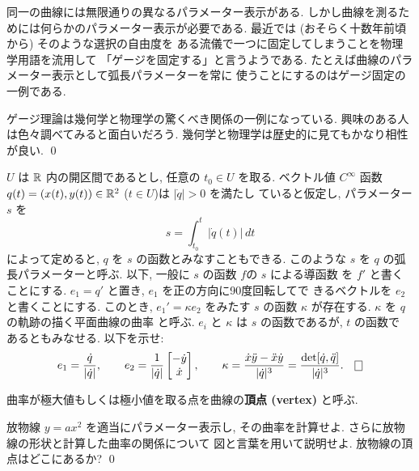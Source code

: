 \documentclass[12pt,twoside]{jarticle}
\newcommand\qstar[1]{}
\begin{document}
\begin{guide}
 同一の曲線には無限通りの異なるパラメーター表示がある.
 しかし曲線を測るためには何らかのパラメーター表示が必要である.
 最近では (おそらく十数年前頃から) そのような選択の自由度を
 ある流儀で一つに固定してしまうことを物理学用語を流用して
 「ゲージを固定する」と言うようである.
 たとえば曲線のパラメーター表示として弧長パラメーターを常に
 使うことにするのはゲージ固定の一例である.

 ゲージ理論は幾何学と物理学の驚くべき関係の一例になっている.
 興味のある人は色々調べてみると面白いだろう.
 幾何学と物理学は歴史的に見てもかなり相性が良い.
 \qed
\end{guide}

\begin{question}[平面曲線の曲率]\qstar{*}
  $U$ は ${\mathbb R}$ 内の開区間であるとし, 任意の $t_0\in U$ を取る. ベクトル値 
  $C^\infty$ 函数 $q(t)=(x(t),y(t))\in{\mathbb R}^2$ ($t\in U$)は $|\dot q|>0$ を満たし
  ていると仮定し, パラメーター $s$ を
  \begin{equation*}
     s = \int_{t_0}^t |\dot q(t)|\,dt
  \end{equation*}
  によって定めると, $q$ を $s$ の函数とみなすこともできる. このような $s$ を 
  $q$ の弧長パラメーターと呼ぶ. 以下, 一般に $s$ の函数 $f$の $s$ による導函数
  を $f'$ と書くことにする. $e_1=q'$ と置き, $e_1$ を正の方向に90度回転してで
  きるベクトルを $e_2$ と書くことにする. このとき, $e_1'=\kappa e_2$ をみたす 
  $s$ の函数 $\kappa$ が存在する. $\kappa$ を $q$ の軌跡の描く平面曲線の曲率
  と呼ぶ. $e_i$ と $\kappa$ は $s$ の函数であるが, $t$ の函数で
  あるともみなせる. 以下を示せ:
  \begin{equation*}
    e_1 = \frac{\dot q}{|\dot q|}, \qquad
    e_2 = 
    \frac{1}{|\dot q|}
    \begin{bmatrix}
     -\dot y \\ \dot x \\
    \end{bmatrix}, 
    \qquad
    \kappa 
    = \frac{\dot x \ddot y - \ddot x \dot y}{|\dot q|^3}
    = \frac{\det[\dot q, \ddot q]}{|\dot q|^3}.
    \qed
  \end{equation*}  
\end{question}

曲率が極大値もしくは極小値を取る点を曲線の{\bf 頂点 (vertex)} と呼ぶ. 

\begin{question}
 放物線 $y=ax^2$ を適当にパラメーター表示し,
 その曲率を計算せよ.
 さらに放物線の形状と計算した曲率の関係について
 図と言葉を用いて説明せよ.
 放物線の頂点はどこにあるか?
 \qed
\end{question}
\end{document}
